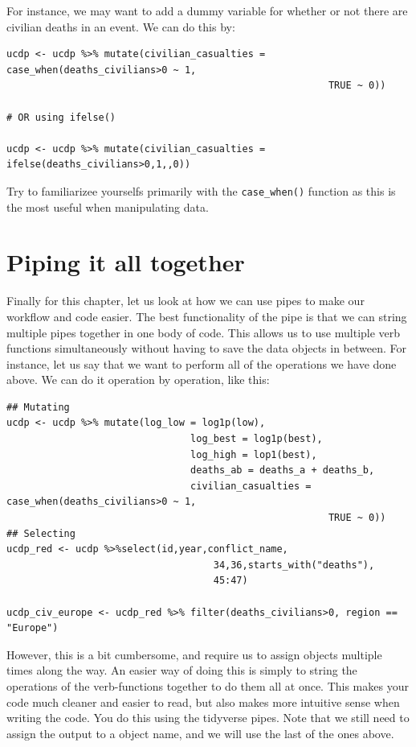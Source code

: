 \documentclass[
]{book}
\begin{document}
For instance, we may want to add a dummy variable for whether or not there are civilian deaths in an event. We can do this by:

\begin{verbatim}
ucdp <- ucdp %>% mutate(civilian_casualties = case_when(deaths_civilians>0 ~ 1,
                                                        TRUE ~ 0))
                                                        
# OR using ifelse()

ucdp <- ucdp %>% mutate(civilian_casualties = ifelse(deaths_civilians>0,1,,0))
\end{verbatim}

Try to familiarizee yourselfs primarily with the \texttt{case\_when()} function as this is the most useful when manipulating data.

\hypertarget{piping-it-all-together}{%
\section{Piping it all together}\label{piping-it-all-together}}

Finally for this chapter, let us look at how we can use pipes to make our workflow and code easier. The best functionality of the pipe is that we can string multiple pipes together in one body of code. This allows us to use multiple verb functions simultaneously without having to save the data objects in between. For instance, let us say that we want to perform all of the operations we have done above. We can do it operation by operation, like this:

\begin{verbatim}
## Mutating
ucdp <- ucdp %>% mutate(log_low = log1p(low),
                                log_best = log1p(best),
                                log_high = lop1(best),
                                deaths_ab = deaths_a + deaths_b,
                                civilian_casualties = case_when(deaths_civilians>0 ~ 1,
                                                        TRUE ~ 0))
## Selecting
ucdp_red <- ucdp %>%select(id,year,conflict_name,
                                    34,36,starts_with("deaths"),
                                    45:47)
                                    
ucdp_civ_europe <- ucdp_red %>% filter(deaths_civilians>0, region == "Europe")
\end{verbatim}

However, this is a bit cumbersome, and require us to assign objects multiple times along the way. An easier way of doing this is simply to string the operations of the verb-functions together to do them all at once. This makes your code much cleaner and easier to read, but also makes more intuitive sense when writing the code. You do this using the tidyverse pipes. Note that we still need to assign the output to a object name, and we will use the last of the ones above.
\end{document}

